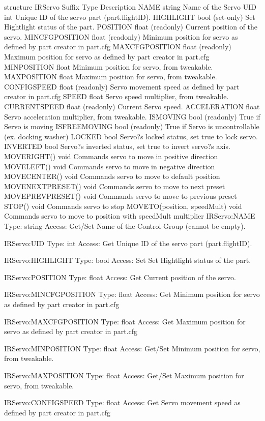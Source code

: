 structure IRServo
Suffix	Type	Description
NAME	string	Name of the Servo
UID	int	Unique ID of the servo part (part.flightID).
HIGHLIGHT	bool (set-only)	Set Hightlight status of the part.
POSITION	float (readonly)	Current position of the servo.
MINCFGPOSITION	float (readonly)	Minimum position for servo as defined by part creator in part.cfg
MAXCFGPOSITION	float (readonly)	Maximum position for servo as defined by part creator in part.cfg
MINPOSITION	float	Minimum position for servo, from tweakable.
MAXPOSITION	float	Maximum position for servo, from tweakable.
CONFIGSPEED	float (readonly)	Servo movement speed as defined by part creator in part.cfg
SPEED	float	Servo speed multiplier, from tweakable.
CURRENTSPEED	float (readonly)	Current Servo speed.
ACCELERATION	float	Servo acceleration multiplier, from tweakable.
ISMOVING	bool (readonly)	True if Servo is moving
ISFREEMOVING	bool (readonly)	True if Servo is uncontrollable (ex. docking washer)
LOCKED	bool	Servo?s locked status, set true to lock servo.
INVERTED	bool	Servo?s inverted status, set true to invert servo?s axis.
MOVERIGHT()	void	Commands servo to move in positive direction
MOVELEFT()	void	Commands servo to move in negative direction
MOVECENTER()	void	Commands servo to move to default position
MOVENEXTPRESET()	void	Commands servo to move to next preset
MOVEPREVPRESET()	void	Commands servo to move to previous preset
STOP()	void	Commands servo to stop
MOVETO(position, speedMult)	void	Commands servo to move to position with speedMult multiplier
IRServo:NAME
Type:	string
Access:	Get/Set
Name of the Control Group (cannot be empty).

IRServo:UID
Type:	int
Access:	Get
Unique ID of the servo part (part.flightID).

IRServo:HIGHLIGHT
Type:	bool
Access:	Set
Set Hightlight status of the part.

IRServo:POSITION
Type:	float
Access:	Get
Current position of the servo.

IRServo:MINCFGPOSITION
Type:	float
Access:	Get
Minimum position for servo as defined by part creator in part.cfg

IRServo:MAXCFGPOSITION
Type:	float
Access:	Get
Maximum position for servo as defined by part creator in part.cfg

IRServo:MINPOSITION
Type:	float
Access:	Get/Set
Minimum position for servo, from tweakable.

IRServo:MAXPOSITION
Type:	float
Access:	Get/Set
Maximum position for servo, from tweakable.

IRServo:CONFIGSPEED
Type:	float
Access:	Get
Servo movement speed as defined by part creator in part.cfg

